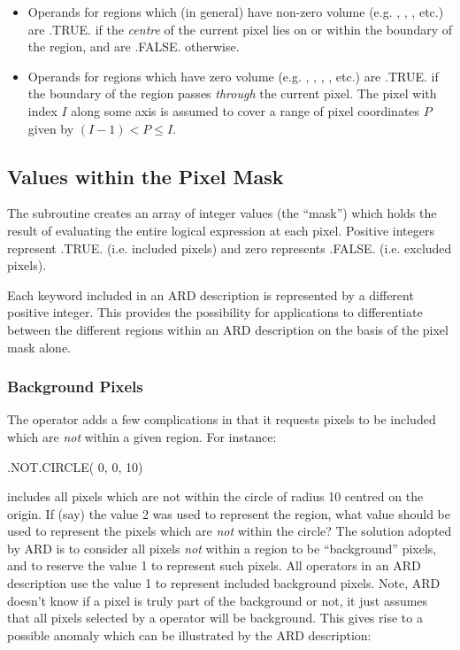 \documentclass[11pt]{starlink}
\begin{document}
\begin{itemize}

\item Operands for regions which (in general) have non-zero volume (e.g.
,
, , etc.) are .TRUE. if the \emph{centre} of the current pixel lies on or
within the boundary of the region, and are .FALSE. otherwise.

\item Operands for regions which have zero volume (e.g.
,
, , ,
etc.) are .TRUE. if the boundary of the region passes \emph{through} the current
pixel. The pixel with index $I$ along some axis is assumed to cover a range of
pixel coordinates $P$ given by $(I-1) < P \leq I$.

\end{itemize}

\subsection{Values within the Pixel Mask}
The  subroutine creates an array of integer values (the ``mask'') which
holds the result of evaluating the entire logical expression at each pixel.
Positive integers represent .TRUE. (i.e. included pixels) and zero represents
.FALSE. (i.e. excluded pixels).

Each keyword included in an ARD description is represented by a different
positive integer. This provides the possibility for applications to
differentiate between the different regions within an ARD description on the
basis of the pixel mask alone.

\subsubsection{Background Pixels}
The  operator adds a few complications in that it requests pixels to be
included which are \emph{not} within a given region. For instance:

\small
\begin{terminalv}
      .NOT.CIRCLE( 0, 0, 10)
\end{terminalv}
\normalsize

includes all pixels which are not within the circle of radius 10 centred on the
origin. If (say) the value 2 was used to represent the  region, what value
should be used to represent the pixels which are \emph{not} within the circle?
The solution adopted by ARD is to consider all pixels \emph{not} within a region
to be ``background'' pixels, and to reserve the value 1 to represent such
pixels. All  operators in an ARD description use the value 1 to represent
included background pixels. Note, ARD doesn't know if a pixel is truly part of
the background or not, it just assumes that all pixels selected by a 
operator will be background. This gives rise to a possible anomaly which can be
illustrated by the ARD description:
\end{document}
